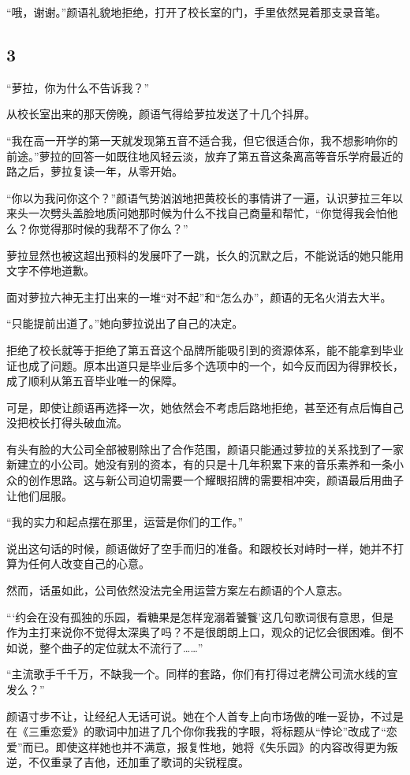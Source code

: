 \documentclass[UTF8, scheme = chinese, openany]{ctexbook}
\begin{document}
“哦，谢谢。”颜语礼貌地拒绝，打开了校长室的门，手里依然晃着那支录音笔。

\subsection{3}

“萝拉，你为什么不告诉我？”

从校长室出来的那天傍晚，颜语气得给萝拉发送了十几个抖屏。

“我在高一开学的第一天就发现第五音不适合我，但它很适合你，我不想影响你的前途。”萝拉的回答一如既往地风轻云淡，放弃了第五音这条离高等音乐学府最近的路之后，萝拉复读一年，从零开始。

“你以为我问你这个？”颜语气势汹汹地把黄校长的事情讲了一遍，认识萝拉三年以来头一次劈头盖脸地质问她那时候为什么不找自己商量和帮忙，“你觉得我会怕他么？你觉得那时候的我帮不了你么？”

萝拉显然也被这超出预料的发展吓了一跳，长久的沉默之后，不能说话的她只能用文字不停地道歉。

面对萝拉六神无主打出来的一堆“对不起”和“怎么办”，颜语的无名火消去大半。

“只能提前出道了。”她向萝拉说出了自己的决定。

拒绝了校长就等于拒绝了第五音这个品牌所能吸引到的资源体系，能不能拿到毕业证也成了问题。原本出道只是毕业后多个选项中的一个，如今反而因为得罪校长，成了顺利从第五音毕业唯一的保障。

可是，即使让颜语再选择一次，她依然会不考虑后路地拒绝，甚至还有点后悔自己没把校长打得头破血流。

有头有脸的大公司全部被剔除出了合作范围，颜语只能通过萝拉的关系找到了一家新建立的小公司。她没有别的资本，有的只是十几年积累下来的音乐素养和一条小众的创作思路。这与新公司迫切需要一个耀眼招牌的需要相冲突，颜语最后用曲子让他们屈服。

“我的实力和起点摆在那里，运营是你们的工作。”

说出这句话的时候，颜语做好了空手而归的准备。和跟校长对峙时一样，她并不打算为任何人改变自己的心意。

然而，话虽如此，公司依然没法完全用运营方案左右颜语的个人意志。

“‘约会在没有孤独的乐园，看糖果是怎样宠溺着饕餮’这几句歌词很有意思，但是作为主打来说你不觉得太深奥了吗？不是很朗朗上口，观众的记忆会很困难。倒不如说，整个曲子的定位就太不流行了……”

“主流歌手千千万，不缺我一个。同样的套路，你们有打得过老牌公司流水线的宣发么？”

颜语寸步不让，让经纪人无话可说。她在个人首专上向市场做的唯一妥协，不过是在《三重恋爱》的歌词中加进了几个你你我我的字眼，将标题从“悖论”改成了“恋爱”而已。即使这样她也并不满意，报复性地，她将《失乐园》的内容改得更为叛逆，不仅重录了吉他，还加重了歌词的尖锐程度。
\end{document}
